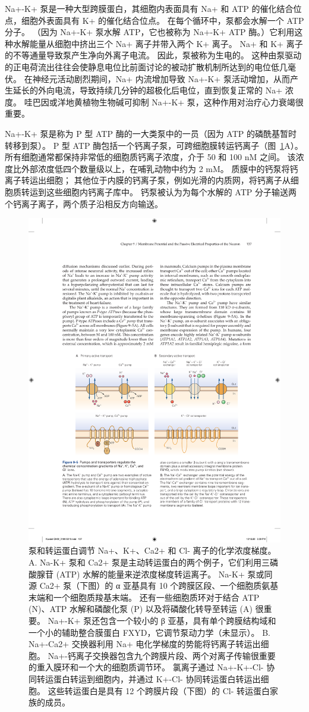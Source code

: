 Na+-K+ 泵是一种大型跨膜蛋白，其细胞内表面具有 Na+ 和 ATP 的催化结合位点，细胞外表面具有 K+ 的催化结合位点。
在每个循环中，泵都会水解一个 ATP 分子。
（因为 Na+-K+ 泵水解 ATP，它也被称为 Na+-K+ ATP 酶。）它利用这种水解能量从细胞中挤出三个 Na+ 离子并带入两个 K+ 离子。
Na+ 和 K+ 离子的不等通量导致泵产生净向外离子电流。
因此，泵被称为生电的。
这种由泵驱动的正电荷流出往往会使静息电位比前面讨论的被动扩散机制所达到的电位低几毫伏。
在神经元活动剧烈期间，Na+ 内流增加导致 Na+-K+ 泵活动增加，从而产生延长的外向电流，导致持续几分钟的超极化后电位，直到恢复正常的 Na+ 浓度。
哇巴因或洋地黄植物生物碱可抑制 Na+-K+ 泵，这种作用对治疗心力衰竭很重要。


Na+-K+ 泵是称为 P 型 ATP 酶的一大类泵中的一员（因为 ATP 的磷酰基暂时转移到泵）。
P 型 ATP 酶包括一个钙离子泵，可跨细胞膜转运钙离子（图~\ref{fig:9_5}A）。
所有细胞通常都保持非常低的细胞质钙离子浓度，介于 50 和 100 nM 之间。
该浓度比外部浓度低四个数量级以上，在哺乳动物中约为 2 mM。
质膜中的钙泵将钙离子转运出细胞；
其他位于内膜的钙离子泵，例如光滑的内质网，将钙离子从细胞质转运到这些细胞内钙离子库中。
钙泵被认为为每个水解的 ATP 分子输送两个钙离子离子，两个质子沿相反方向输送。


\begin{figure}[htbp]
	\centering
	\includegraphics[width=0.7\linewidth]{chap09/fig_9_5}
	\caption{泵和转运蛋白调节 Na+、K+、Ca2+ 和 Cl- 离子的化学浓度梯度。 A. Na-K+ 泵和 Ca2+ 泵是主动转运蛋白的两个例子，它们利用三磷酸腺苷 (ATP) 水解的能量来逆浓度梯度转运离子。 Na-K+ 泵或同源 Ca2+ 泵（下图）的 α 亚基具有 10 个跨膜区段、一个细胞质氨基末端和一个细胞质羧基末端。 还有一些细胞质环对于结合 ATP (N)、ATP 水解和磷酸化泵 (P) 以及将磷酸化转导至转运 (A) 很重要。 Na+-K+ 泵还包含一个较小的 β 亚基，具有单个跨膜结构域和一个小的辅助整合膜蛋白 FXYD，它调节泵动力学（未显示）。 B. Na+-Ca2+ 交换器利用 Na+ 电化学梯度的势能将钙离子转运出细胞。 Na+-钙离子交换器包含九个跨膜片段、两个对离子传输很重要的重入膜环和一个大的细胞质调节环。 氯离子通过 Na+-K+-Cl- 协同转运蛋白转运到细胞内，并通过 K+-Cl- 协同转运蛋白转运出细胞。 这些转运蛋白是具有 12 个跨膜片段（下图）的 Cl- 转运蛋白家族的成员。}
	\label{fig:9_5}
\end{figure}


